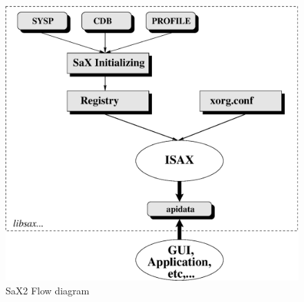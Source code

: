 \begin{figure}[h]
\caption{SaX2 Flow diagram}
\vspace*{0.2cm}
\includegraphics[scale=0.5]{figures/sax.eps}
\end{figure}

